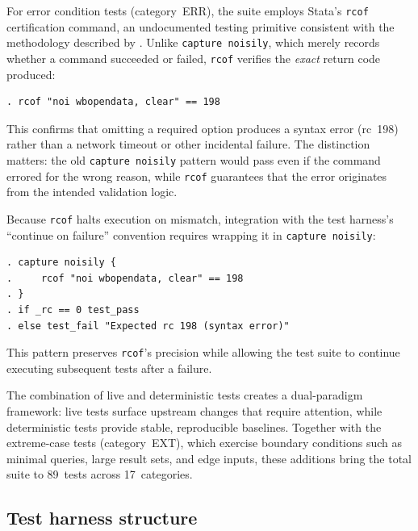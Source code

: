 \documentclass[bib]{statapress}
\begin{document}
For error condition tests (category~ERR), the suite employs Stata's
\texttt{rcof} certification command, an undocumented testing primitive
consistent with the methodology described by
\citet{gould2001certification}.  Unlike \texttt{capture noisily}, which
merely records whether a command succeeded or failed, \texttt{rcof}
verifies the \emph{exact} return code produced:

\begin{stlog}
\begin{verbatim}
. rcof "noi wbopendata, clear" == 198
\end{verbatim}
\nullskip
\end{stlog}

\noindent This confirms that omitting a required option produces a syntax error
(rc~198) rather than a network timeout or other incidental failure.  The
distinction matters: the old \texttt{capture noisily} pattern would pass
even if the command errored for the wrong reason, while \texttt{rcof}
guarantees that the error originates from the intended validation logic.

Because \texttt{rcof} halts execution on mismatch, integration with the
test harness's ``continue on failure'' convention requires wrapping it in
\texttt{capture noisily}:

\begin{stlog}
\begin{verbatim}
. capture noisily {
.     rcof "noi wbopendata, clear" == 198
. }
. if _rc == 0 test_pass
. else test_fail "Expected rc 198 (syntax error)"
\end{verbatim}
\nullskip
\end{stlog}

\noindent This pattern preserves \texttt{rcof}'s precision while allowing the
test suite to continue executing subsequent tests after a failure.

The combination of live and deterministic tests creates a dual-paradigm
framework: live tests surface upstream changes that require attention, while
deterministic tests provide stable, reproducible baselines.  Together with the
extreme-case tests (category~EXT), which exercise boundary conditions such as
minimal queries, large result sets, and edge inputs, these additions bring the
total suite to 89~tests across 17~categories.

\subsection{Test harness structure}
\end{document}
